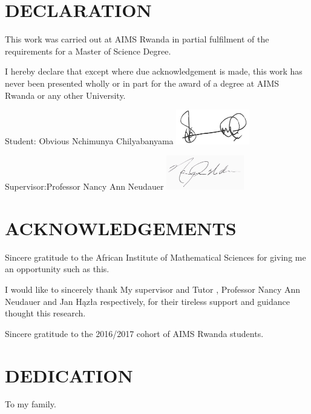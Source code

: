 \chapter*{DECLARATION}
This work was carried out at AIMS Rwanda in partial fulfilment of the requirements for a Master of Science Degree.

I hereby declare that except where due acknowledgement is made, this work has never been presented wholly or in part for the award of a degree at AIMS Rwanda or any other University.

\vspace{1.5cm}
Student: Obvious Nchimunya Chilyabanyama \includegraphics[height=1.5cm]{images/signature.png}

\vspace{1.5cm}

Supervisor:Professor Nancy Ann Neudauer  \includegraphics[height=1.5cm]{images/NancyAnnNeudauer.jpg}


\newpage

\chapter*{ACKNOWLEDGEMENTS}
Sincere gratitude to the African Institute of Mathematical Sciences for giving me an opportunity such as this.

I would like to sincerely thank My supervisor and Tutor , Professor Nancy Ann Neudauer and Jan H{\k{a}}z{\l}a respectively, for their tireless support and guidance thought this research.

Sincere gratitude to the 2016/2017 cohort of AIMS Rwanda students.
 
\newpage
\chapter*{DEDICATION} 

To my family.